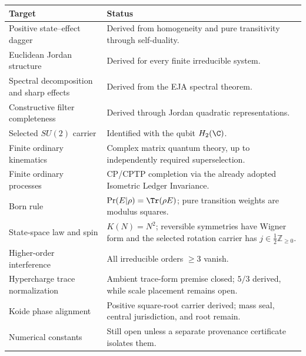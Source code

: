 \begin{remark}
\begin{center}
\small
\begin{tabularx}{\textwidth}{l Y}
\toprule
Target & Status \\
\midrule
Positive state--effect dagger
& Derived from homogeneity and pure transitivity through self-duality. \\
Euclidean Jordan structure
& Derived for every finite irreducible system. \\
Spectral decomposition and sharp effects
& Derived from the EJA spectral theorem. \\
Constructive filter completeness
& Derived through Jordan quadratic representations. \\
Selected $SU(2)$ carrier
& Identified with the qubit $H_2(\C)$. \\
Finite ordinary kinematics
& Complex matrix quantum theory, up to independently required superselection. \\
Finite ordinary processes
& CP/CPTP completion via the already adopted Isometric Ledger Invariance. \\
Born rule
& $\Pr(E|\rho)=\Tr(\rho E)$; pure transition weights are modulus squares. \\
State-space law and spin
& $K(N)=N^2$; reversible symmetries have Wigner form and the selected rotation carrier has $j\in\tfrac12\mathbb Z_{\ge0}$. \\
Higher-order interference
& All irreducible orders $\ge3$ vanish. \\
Hypercharge trace normalization
& Ambient trace-form premise closed; $5/3$ derived, while scale placement remains open. \\
Koide phase alignment
& Positive square-root carrier derived; mass seal, central jurisdiction, and root remain. \\
Numerical constants
& Still open unless a separate provenance certificate isolates them. \\
\bottomrule
\end{tabularx}
\end{center}
\end{remark}

